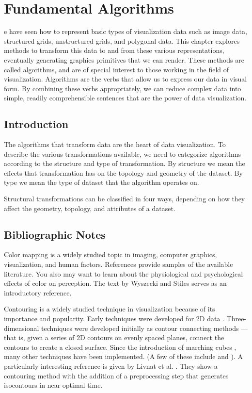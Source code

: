\chapter{Fundamental Algorithms}
\label{chap:fundamental_algorithms}

e have seen how to represent basic types of visualization data such as image data, structured grids, unstructured grids, and polygonal data.
This chapter explores methods to transform this data to and from these various representations, eventually generating graphics primitives that we can render.
These methods are called algorithms, and are of special interest to those working in the field of visualization.
Algorithms are the verbs that allow us to express our data in visual form.
By combining these verbs appropriately, we can reduce complex data into simple, readily comprehensible sentences that are the power of data visualization.

\section{Introduction}

The algorithms that transform data are the heart of data visualization.
To describe the various transformations available, we need to categorize algorithms according to the structure and type of transformation.
By structure we mean the effects that transformation has on the topology and geometry of the dataset.
By type we mean the type of dataset that the algorithm operates on.

Structural transformations can be classified in four ways, depending on how they affect the geometry, topology, and attributes of a dataset.

\section{Bibliographic Notes}

Color mapping is a widely studied topic in imaging, computer graphics, visualization, and human factors. References \cite{Durrett87} \cite{Ware88} \cite{Rheingans92} provide samples of the available literature. You also may want to learn about the physiological and psychological effects of color on perception. The text by Wyszecki and Stiles \cite{Wyszecki82} serves as an introductory reference.

Contouring is a widely studied technique in visualization because of its importance and popularity. Early techniques were developed for 2D data \cite{Watson92}. Three-dimensional techniques were developed initially as contour connecting methods \cite{Fuchs77} --- that is, given a series of 2D contours on evenly spaced planes, connect the contours to create a closed surface. Since the introduction of marching cubes \cite{Lorensen87}, many other techniques have been implemented. (A few of these include \cite{Nielson91} \cite{Montani94} and \cite{Durst88} ). A particularly interesting reference is given by Livnat et al. \cite{Livnat96}. They show a contouring method with the addition of a preprocessing step that generates isocontours in near optimal time.

